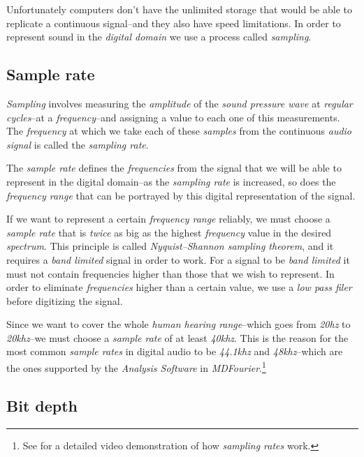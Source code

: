 \documentclass[10pt,a4paper]{report}
\newcommand{\hz}[1]{\textit{\mbox{#1\acrshort{hz}}}}
\newcommand{\khz}[1]{\textit{\mbox{#1\acrshort{khz}}}}
\begin{document}
Unfortunately computers don't have the unlimited storage that would be able to replicate a continuous signal--and they also have speed limitations. In order to represent sound in the \textit{digital domain} we use a process called \textit{sampling}. 

\subsection{Sample rate}

\textit{Sampling} involves measuring the \textit{amplitude} of the \textit{sound pressure wave} at \textit{regular cycles}--at a \textit{frequency}--and assigning a value to each one of this measurements. The \textit{frequency} at which we take each of these \textit{samples} from the continuous \textit{audio signal} is called the \textit{sampling rate}. 

The \textit{sample rate} defines the \textit{frequencies} from the signal that we will be able to represent in the digital domain--as the \textit{sampling rate} is increased, so does the \textit{frequency range} that can be portrayed by this digital representation of the signal. 

If we want to represent a certain \textit{frequency range} reliably, we must choose a \textit{sample rate} that is \textit{twice} as big as the highest \textit{frequency} value in the desired \textit{spectrum}. This principle is called  \textit{Nyquist–Shannon sampling theorem}, and it requires a \textit{band limited} signal in order to work. For a signal to be \textit{band limited} it must not contain frequencies higher than those that we wish to represent. In order to eliminate \textit{frequencies} higher than a certain value, we use a \textit{low pass filer} before digitizing the signal.

Since we want to cover the whole \textit{human hearing range}--which goes from \hz{20} to \khz{20}--we must choose a \textit{sample rate} of at least \khz{40}. This is the reason for the most common \textit{sample rates} in digital audio to be \khz{44.1} and \khz{48}--which are the ones supported by the \textit{Analysis Software} in \textit{MDFourier}.\footnote{See \cite{MontyMontgomery} for a detailed video demonstration of how \textit{sampling rates} work.}


\subsection{Bit depth}
\end{document}

